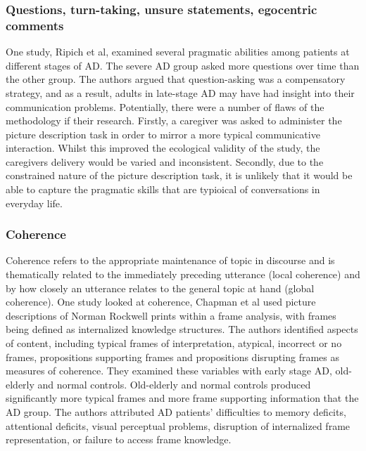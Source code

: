 \documentclass{article}
\begin{document}
\subsubsection{Questions, turn-taking, unsure statements, egocentric comments}
One study, Ripich et al, examined several pragmatic abilities among patients at different stages of AD. The severe AD group asked more questions over time than the other group. The authors argued that question-asking was a compensatory strategy, and as a result, adults in late-stage AD may have had insight into their communication problems. Potentially, there were a number of flaws of the methodology if their research. Firstly, a caregiver was asked to administer the picture description task in order to mirror a more typical communicative interaction. Whilst this improved the ecological validity of the study, the caregivers delivery would be varied and inconsistent. Secondly, due to the constrained nature of the picture description task, it is unlikely that it would be able to capture the pragmatic skills that are typioical of conversations in everyday life. \newline
\par
\subsubsection{Coherence}
Coherence refers to the appropriate maintenance of topic in discourse and is thematically related to the immediately preceding utterance (local coherence) and by how closely an utterance relates to the general topic at hand (global coherence). One study looked at coherence, Chapman et al used picture descriptions of Norman Rockwell prints within a frame analysis, with frames being defined as internalized knowledge structures. The authors identified aspects of content, including typical frames of interpretation, atypical, incorrect or no frames, propositions supporting frames and propositions disrupting frames as measures of coherence. They examined these variables with early stage AD, old-elderly and normal controls. Old-elderly and normal controls produced significantly more typical frames and more frame supporting information that the AD group. The authors attributed AD patients' difficulties to memory deficits, attentional deficits, visual perceptual problems, disruption of internalized frame representation, or failure to access frame knowledge. \newline
\par
\end{document}
